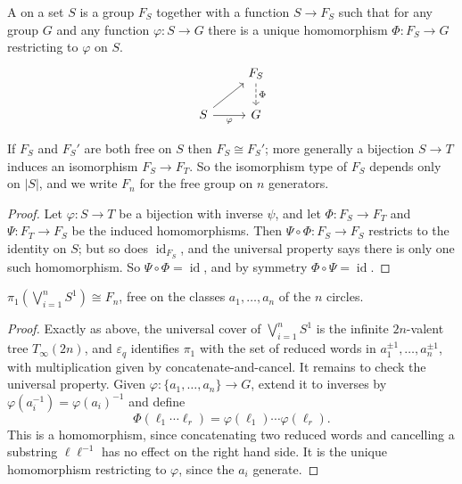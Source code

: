 \documentclass[a4paper]{scrartcl}
\newcommand{\id}{\operatorname{id}}
\begin{document}
\begin{definition}
	A  on a set $S$ is a group $F_S$ together with a function $S \to F_S$ such that for any group $G$ and any function $\varphi: S \to G$ there is a unique homomorphism $\Phi: F_S \to G$ restricting to $\varphi$ on $S$.
	\[\begin{tikzcd}
		& {F_S} \arrow[d, "\Phi", dashed] \\
		S \arrow[ru] \arrow[r, "\varphi"'] & G
	\end{tikzcd}\]
\end{definition}

\begin{lemma}
	If $F_S$ and $F_S'$ are both free on $S$ then $F_S \cong F_S'$; more generally a bijection $S \to T$ induces an isomorphism $F_S \to F_T$. So the isomorphism type of $F_S$ depends only on $|S|$, and we write $F_n$ for the free group on $n$ generators.
\end{lemma}
\begin{proof}
	Let $\varphi: S \to T$ be a bijection with inverse $\psi$, and let $\Phi: F_S \to F_T$ and $\Psi: F_T \to F_S$ be the induced homomorphisms. Then $\Psi \circ \Phi: F_S \to F_S$ restricts to the identity on $S$; but so does $\id_{F_S}$, and the universal property says there is only one such homomorphism. So $\Psi \circ \Phi = \id$, and by symmetry $\Phi \circ \Psi = \id$.
\end{proof}

\begin{theorem} \label{thm:pi1-wedge-circles}
	$\pi_1\!\left(\bigvee_{i=1}^n S^1\right) \cong F_n$, free on the classes $a_1, \dots, a_n$ of the $n$ circles.
\end{theorem}
\begin{proof}
	Exactly as above, the universal cover of $\bigvee_{i=1}^n S^1$ is the infinite $2n$-valent tree $T_\infty(2n)$, and $\varepsilon_q$ identifies $\pi_1$ with the set of reduced words in $a_1^{\pm1},\dots,a_n^{\pm1}$, with multiplication given by concatenate-and-cancel. It remains to check the universal property. Given $\varphi: \{a_1,\dots,a_n\} \to G$, extend it to inverses by $\varphi(a_i^{-1}) = \varphi(a_i)^{-1}$ and define
	$$
	\Phi(\ell_1\cdots\ell_r) = \varphi(\ell_1)\cdots\varphi(\ell_r).
	$$
	This is a homomorphism, since concatenating two reduced words and cancelling a substring $\ell\ell^{-1}$ has no effect on the right hand side. It is the unique homomorphism restricting to $\varphi$, since the $a_i$ generate.
\end{proof}
\end{document}
